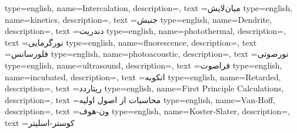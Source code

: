 {
    type=english,
    name={Intercalation},
    description={},
    text ={میان‌لایش}
}
{
    type=english,
    name={kinetics},
    description={},
    text ={جنبش}
}
{
    type=english,
    name={Dendrite},
    description={},
    text ={دندریت}
}
{
    type=english,
    name={photothermal},
    description={},
    text ={نورگرمایی}
}
{
    type=english,
    name={fluorescence},
    description={},
    text ={فلورسانس}
}
{
    type=english,
    name={photoacoustic},
    description={},
    text ={نورصوتی}
}
{
    type=english,
    name={ultrasound},
    description={},
    text ={فراصوت}
}
{
    type=english,
    name={incubated},
    description={},
    text ={انکوبه}
}
{
    type=english,
    name={Retarded},
    description={},
    text ={ریتاردد}
}
{
    type=english,
    name={First Principle Calculations},
    description={},
    text ={محاسبات از اصول اولیه}
}
{
    type=english,
    name={Van-Hoff},
    description={},
    text ={ون-هوف}
}
{
    type=english,
    name={Koster-Slater},
    description={},
    text ={کوستر-اسلیتر}
}